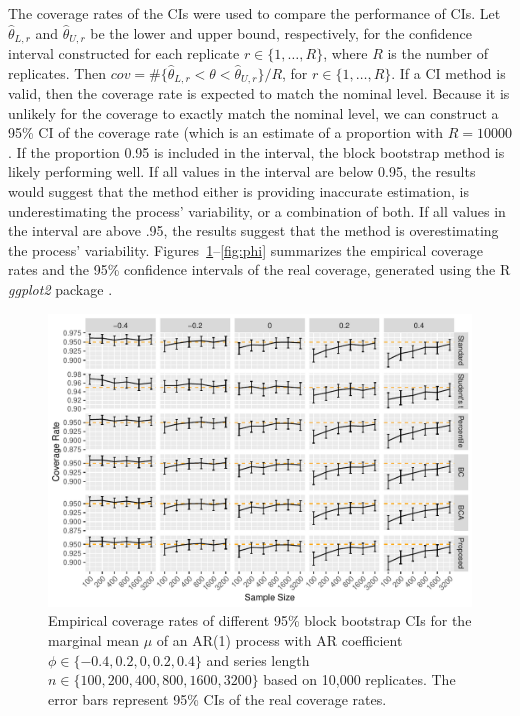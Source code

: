 \documentclass[12pt, letterpaper, titlepage]{article}
\begin{document}
The coverage rates of the CIs were used to compare the performance of CIs.
Let $\hat\theta_{L, r}$ and $\hat\theta_{U, r}$ be the lower and upper bound,
respectively, for the confidence interval constructed for each replicate
$r \in \{1, \ldots, R\}$, where $R$ is the
number of replicates.
Then $cov = \#\{\hat\theta_{L, r} < \theta < \hat\theta_{U, r} \}/R$,  
for $r \in \{1, \ldots, R\}$.
If a CI method is valid, then the coverage rate is expected to match the
nominal 
level. Because it is unlikely for the coverage to exactly match the nominal
level,
we can construct a 95\% CI of the coverage
rate (which is an estimate of a proportion with $R = 10000$. If the
proportion
0.95 is included in the interval, the block bootstrap method is likely
performing
well. If all values in the interval are below 0.95, the results would suggest 
that the
method either is providing inaccurate estimation, is underestimating the
process' variability, or a combination of both. If all values in the interval
are above .95, the results suggest that the method is overestimating the
process' variability.
Figures~\ref{fig:mu}--\ref{fig:phi} summarizes the empirical coverage rates and
the 95\% confidence intervals of the real coverage, generated using the R
\textsl{ggplot2} package \citep{ggplot2}.


\begin{figure}[tbp]
  \centering
  \includegraphics[width=\textwidth]{figures/plot_norm_mu}
  \caption{Empirical coverage rates of different 95\% block bootstrap CIs for
    the marginal mean $\mu$ of an AR(1) process with AR coefficient
    $\phi \in \{-0.4, 0.2, 0, 0.2, 0.4\}$ and series length
    $n \in \{100, 200, 400, 800, 1600, 3200\}$ based on 10,000 replicates.
    The error bars represent 95\% CIs of the real coverage rates.}
  \label{fig:mu}
\end{figure}
\end{document}
